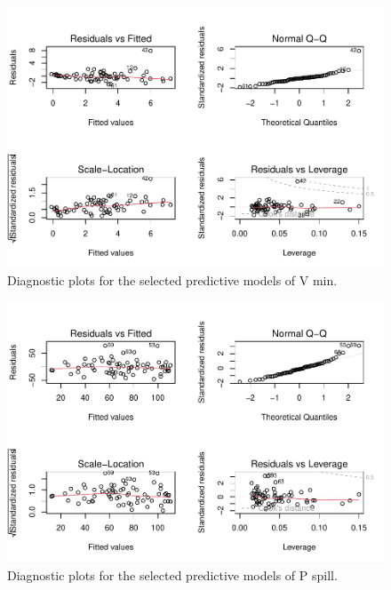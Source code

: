 \documentclass[hess, manuscript]{copernicus}
\begin{document}
\begin{figure}
\includegraphics[width=1\linewidth]{Kouba_2023_end_of_dry_season_manuscript_Comment-Responses-due-2023.07.24_files/figure-latex/selected_model_diagnostics_vmin-1} \caption{\label{fig:vmin_selected_diagnostics} Diagnostic plots for the selected predictive models of V min.}\label{fig:selected_model_diagnostics_vmin}
\end{figure}

\begin{figure}
\includegraphics[width=1\linewidth]{Kouba_2023_end_of_dry_season_manuscript_Comment-Responses-due-2023.07.24_files/figure-latex/selected_model_diagnostics_pspsill-1} \caption{\label{fig:vmin_selected_diagnostics} Diagnostic plots for the selected predictive models of P spill.}\label{fig:selected_model_diagnostics_pspsill}
\end{figure}
\end{document}
